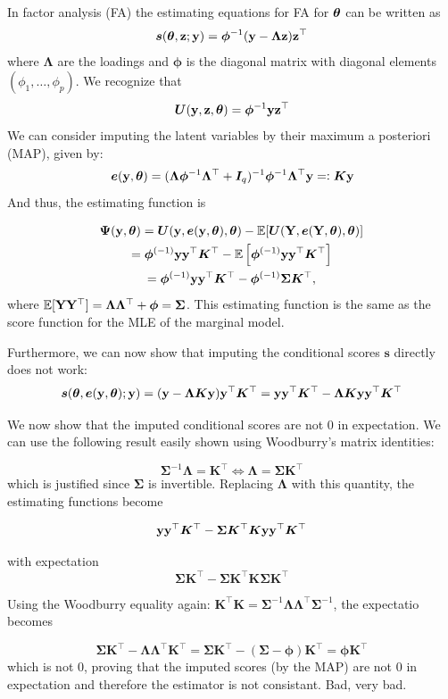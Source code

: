 \documentclass[twoside,11pt]{article}
\newcommand{\gb}[2][]{\todo[color=gbcolor, caption={GB}, #1]{#2}}
\newcommand{\E}{{\mathbb{E}}}
\begin{document}
In factor analysis (FA) \gb{Write the generative model} the estimating equations for FA for ${\bm{\theta}}$ can be written as
%
$$
\bm s({\bm{\theta}}, {\bf z}; {\bf y}) = \bm\phi^{-1}({\bf y} - \bm\Lambda{\bf z}){\bf z}^\top
$$
%
where $\bm\Lambda$ are the loadings and $\bm\phi$ is the diagonal matrix with diagonal elements $(\phi_1, \dots, \phi_p)$. We recognize that 
%
$$
\bm U({\bf y}, {\bf z}, {\bm{\theta}}) = \bm\phi^{-1}{\bf y}{\bf z}^\top
$$
%
We can consider imputing the latent variables by their maximum a posteriori (MAP), given by: 
$$
{\bm e}({\bf y}, {\bm{\theta}}) = (\bm\Lambda \bm\phi^{-1}\bm\Lambda^\top + \bm I_q)^{-1}\bm\phi^{-1}\bm\Lambda^\top{\bf y} =\vcentcolon  \bm K {\bf y}
$$
And thus, the estimating function is

\begin{multline}
\bm \Psi(\y, \bt) = \bm U(\y, \e(\y, \bt), \bt) - \E[\bm U(\Y, \e(\Y, \bt), \bt)] 
\\= \bm\phi^{(-1)}\y\y^\top \bm K^\top - \E\left[\bm\phi^{(-1)}\y\y^\top \bm K^\top\right]
\\= \bm\phi^{(-1)}\y\y^\top \bm K^\top - \bm\phi^{(-1)}\bm\Sigma \bm K^\top,
\end{multline}
where $\E[\Y\Y^\top] = \bm\Lambda \bm\Lambda^\top + \bm\phi = \bm \Sigma$. This estimating function is the same as the score function for the MLE of the marginal model.

Furthermore, we can now show that imputing the conditional scores $\bm s$ directly does not work:
$$
\bm s({\bm{\theta}}, {\bm e}({\bf y}, {\bm{\theta}}); {\bf y}) = ({\bf y} - \bm\Lambda \bm K {\bf y}){\bf y}^\top \bm K^\top = {\bf y}{\bf y}^\top \bm K^\top  - \bm\Lambda \bm K {\bf y} {\bf y}^\top \bm K^\top 
$$

We now show that the imputed conditional scores are not 0 in expectation. We can use the following result easily shown using Woodburry's matrix identities:

$$
\bm \Sigma^{-1} \bm\Lambda = \bm K^\top \Leftrightarrow \bm\Lambda = \bm \Sigma \bm K^\top
$$
which is justified since $\bm\Sigma$ is invertible. Replacing $\bm\Lambda$ with this quantity, the estimating functions become

$$
 {\bf y}{\bf y}^\top \bm K^\top  - \bm \Sigma \bm K^\top \bm K {\bf y} {\bf y}^\top \bm K^\top 
 $$

 with expectation
$$
 \bm\Sigma \bm K^\top  - \bm \Sigma \bm K^\top \bm K \bm\Sigma \bm K^\top 
 $$

Using the Woodburry equality again: $\bm K^\top \bm K = \bm\Sigma^{-1} \bm\Lambda\bm\Lambda^\top \bm\Sigma^{-1}$, the expectatio becomes

$$
\bm\Sigma \bm K^\top - \bm\Lambda\bm\Lambda^\top \bm K^\top = \bm\Sigma \bm K^\top - (\bm\Sigma - \bm\phi) \bm K^\top = \bm\phi\bm K^\top
$$
which is not $0$, proving that the imputed scores (by the MAP) are not 0 in expectation and therefore the estimator is not consistant. Bad, very bad.
\end{document}
